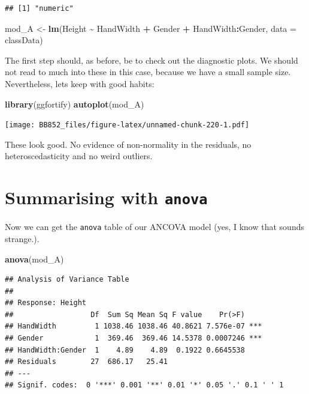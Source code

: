 \documentclass[
  a4paperpaper,
]{book}
\newenvironment{Shaded}{\begin{snugshade}}{\end{snugshade}}
\newcommand{\DataTypeTok}[1]{\textcolor[rgb]{0.13,0.29,0.53}{#1}}
\newcommand{\KeywordTok}[1]{\textcolor[rgb]{0.13,0.29,0.53}{\textbf{#1}}}
\newcommand{\NormalTok}[1]{#1}
\newcommand{\OperatorTok}[1]{\textcolor[rgb]{0.81,0.36,0.00}{\textbf{#1}}}
\newcommand{\StringTok}[1]{\textcolor[rgb]{0.31,0.60,0.02}{#1}}
\begin{document}
\begin{verbatim}
## [1] "numeric"
\end{verbatim}

\begin{Shaded}
\begin{Highlighting}[]
\NormalTok{mod\_A \textless{}{-}}\StringTok{ }\KeywordTok{lm}\NormalTok{(Height }\OperatorTok{\textasciitilde{}}\StringTok{ }\NormalTok{HandWidth }\OperatorTok{+}\StringTok{ }\NormalTok{Gender }\OperatorTok{+}\StringTok{ }\NormalTok{HandWidth}\OperatorTok{:}\NormalTok{Gender, }\DataTypeTok{data =}\NormalTok{ classData)}
\end{Highlighting}
\end{Shaded}

The first step should, as before, be to check out the diagnostic plots. We should not read to much into these in this case, because we have a small sample size. Nevertheless, lets keep with good habits:

\begin{Shaded}
\begin{Highlighting}[]
\KeywordTok{library}\NormalTok{(ggfortify)}
\KeywordTok{autoplot}\NormalTok{(mod\_A)}
\end{Highlighting}
\end{Shaded}

\texttt{[image: BB852\_files/figure-latex/unnamed-chunk-220-1.pdf]}

These look good. No evidence of non-normality in the residuals, no heteroscedasticity and no weird outliers.

\hypertarget{summarising-with-anova}{%
\section{\texorpdfstring{Summarising with \texttt{anova}}{Summarising with anova}}\label{summarising-with-anova}}

Now we can get the \texttt{anova} table of our ANCOVA model (yes, I know that sounds strange.).

\begin{Shaded}
\begin{Highlighting}[]
\KeywordTok{anova}\NormalTok{(mod\_A)}
\end{Highlighting}
\end{Shaded}

\begin{verbatim}
## Analysis of Variance Table
## 
## Response: Height
##                  Df  Sum Sq Mean Sq F value    Pr(>F)    
## HandWidth         1 1038.46 1038.46 40.8621 7.576e-07 ***
## Gender            1  369.46  369.46 14.5378 0.0007246 ***
## HandWidth:Gender  1    4.89    4.89  0.1922 0.6645538    
## Residuals        27  686.17   25.41                      
## ---
## Signif. codes:  0 '***' 0.001 '**' 0.01 '*' 0.05 '.' 0.1 ' ' 1
\end{verbatim}
\end{document}
